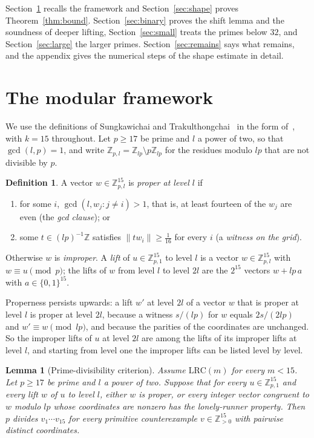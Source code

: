 \documentclass[aps,prd,twocolumn,superscriptaddress,nofootinbib,longbibliography,floatfix,showkeys,amsmath,amssymb,10pt]{revtex4-2}
\newtheorem{lemma}[theorem]{Lemma}
\theoremstyle{definition}
\newtheorem{definition}[theorem]{Definition}
\theoremstyle{remark}
\newcommand{\Z}{\mathbb{Z}}
\newcommand{\LRC}{\mathrm{LRC}}
\begin{document}
Section~\ref{sec:framework} recalls the framework and
Section~\ref{sec:shape} proves Theorem~\ref{thm:bound}.
Section~\ref{sec:binary} proves the shift lemma and the soundness of deeper
lifting, Section~\ref{sec:small} treats the primes below $32$, and
Section~\ref{sec:large} the larger primes. Section~\ref{sec:remains} says
what remains, and the appendix gives the numerical steps of the shape
estimate in detail.

\section{The modular framework}\label{sec:framework}

We use the definitions of Sungkawichai and Trakulthongchai~\cite{ST26} in the
form of~\cite[Sect.~2]{All26}, with $k=15$ throughout. Let $p\ge17$ be prime
and $l$ a power of two, so that $\gcd(l,p)=1$, and write
$\Z_{p,l}=\Z_{lp}\setminus p\Z_{lp}$ for the residues modulo $lp$ that are not
divisible by $p$.

\begin{definition}\label{def:proper}
A vector $w\in\Z_{p,l}^{15}$ is \emph{proper at level $l$} if
\begin{enumerate}[label=(\alph*),leftmargin=2em]
\item for some $i$, $\gcd(l,w_j:j\ne i)>1$, that is, at least fourteen of
the $w_j$ are even (the \emph{gcd clause}); or
\item some $t\in(lp)^{-1}\Z$ satisfies $\|tw_i\|\ge\frac1{16}$ for every $i$
(a \emph{witness on the grid}).
\end{enumerate}
Otherwise $w$ is \emph{improper}. A \emph{lift} of $u\in\Z_{p,1}^{15}$ to
level $l$ is a vector $w\in\Z_{p,l}^{15}$ with $w\equiv u\pmod p$; the lifts of
$w$ from level $l$ to level $2l$ are the $2^{15}$ vectors $w+lp\,a$ with
$a\in\{0,1\}^{15}$.
\end{definition}

Properness persists upwards: a lift $w'$ at level $2l$ of a vector $w$ that
is proper at level $l$ is proper at level $2l$, because a witness $s/(lp)$
for $w$ equals $2s/(2lp)$ and $w'\equiv w\pmod{lp}$, and because the
parities of the coordinates are unchanged. So the improper lifts of $u$ at
level $2l$ are among the lifts of its improper lifts at level $l$, and
starting from level one the improper lifts can be listed level by level.

\begin{lemma}[Prime-divisibility criterion]\label{lem:criterion}
Assume $\LRC(m)$ for every $m<15$. Let $p\ge17$ be prime and $l$ a power of
two. Suppose that for every $u\in\Z_{p,1}^{15}$ and every lift $w$ of $u$ to
level $l$, either $w$ is proper, or every integer vector congruent to $w$
modulo $lp$ whose coordinates are nonzero has the lonely-runner property.
Then $p$ divides $v_1\cdots v_{15}$ for every primitive counterexample
$v\in\Z_{>0}^{15}$ with pairwise distinct coordinates.
\end{lemma}
\end{document}
